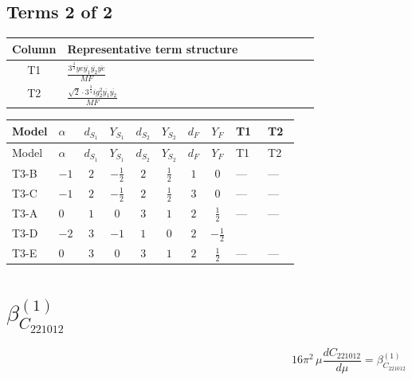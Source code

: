 \documentclass[8pt]{article}
\begin{document}
\begin{landscape}
\subsection*{Terms 2 of 2}
\begin{center}
\begin{tabular}{@{}c >{\raggedright\arraybackslash}p{0.82\linewidth}@{}}
\toprule
Column & Representative term structure \\
\midrule
T1 & \(\displaystyle \frac{3^{\frac{3}{4}} ye \overline{y_{1}} \overline{y_{2}} \overline{ye}}{MF}\) \\
\midrule
T2 & \(\displaystyle \frac{\sqrt{2} \cdot 3^{\frac{3}{4}} i g_{2}^{2} \overline{y_{1}} \overline{y_{2}}}{MF}\) \\
\midrule
\bottomrule
\end{tabular}
\end{center}
\smallskip
\tiny
\begin{longtable}{@{}llcccccc >{\raggedright\arraybackslash}p{0.21\linewidth} >{\raggedright\arraybackslash}p{0.21\linewidth}@{}}
\toprule
Model & $\alpha$ & $d_{S_1}$ & $Y_{S_1}$ & $d_{S_2}$ & $Y_{S_2}$ & $d_F$ & $Y_F$ & T1 & T2 \\
\midrule
\endfirsthead
\toprule
Model & $\alpha$ & $d_{S_1}$ & $Y_{S_1}$ & $d_{S_2}$ & $Y_{S_2}$ & $d_F$ & $Y_F$ & T1 & T2 \\
\midrule
\endhead
T3-B & $-1$ & $2$ & $-\frac{1}{2}$ & $2$ & $\frac{1}{2}$ & $1$ & $0$ & --- & --- \\
\midrule
T3-C & $-1$ & $2$ & $-\frac{1}{2}$ & $2$ & $\frac{1}{2}$ & $3$ & $0$ & --- & --- \\
\midrule
T3-A & $0$ & $1$ & $0$ & $3$ & $1$ & $2$ & $\frac{1}{2}$ & --- & --- \\
\midrule
T3-D & $-2$ & $3$ & $-1$ & $1$ & $0$ & $2$ & $-\frac{1}{2}$ & \scriptsize\adjustbox{max width=\linewidth}{$\begin{gathered} \frac{3^{\frac{3}{4}} ye \overline{y_{1}} \overline{y_{2}} \overline{ye}}{12 MF}\end{gathered}$} & \scriptsize\adjustbox{max width=\linewidth}{$\begin{gathered} \frac{\sqrt{2} \cdot 3^{\frac{3}{4}} i g_{2}^{2} \overline{y_{1}} \overline{y_{2}}}{3 MF}\end{gathered}$} \\
\midrule
T3-E & $0$ & $3$ & $0$ & $3$ & $1$ & $2$ & $\frac{1}{2}$ & --- & --- \\
\midrule
\bottomrule
\end{longtable}
\clearpage
\section*{$\beta_{C_{221012}}^{(1)}$}
\[16\pi^2\,\mu\frac{d C_{221012}}{d\mu}=\beta_{C_{221012}}^{(1)}\]

\end{landscape}
\end{document}
